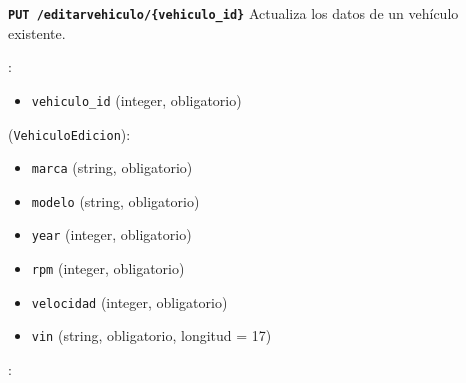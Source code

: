 \documentclass[a4paper,11pt,spanish]{sphinxmanual}
\newcommand{\robotoMonoBold}{\fontseries{b}\selectfont\ttfamily}
\renewcommand{\sphinxcode}[1]{\textcolor{sphinxorangeCode}{{\robotoMonoBold #1}}}
\renewcommand{\sphinxbfcode}[1]{\textbf{\sphinxcode{#1}}}
\renewcommand{\sphinxupquote}[1]{\texttt{#1}}
\begin{document}
\begin{fulllineitems}
\label{\detokenize{endpoints:put--editar-vehiculo-vehiculo_id}}
\pysigstartsignatures
\pysigline
{\sphinxbfcode{\sphinxupquote{PUT~}}\sphinxbfcode{\sphinxupquote{/editar\sphinxhyphen{}vehiculo/\{vehiculo\_id\}}}}
\pysigstopsignatures
\sphinxAtStartPar
Actualiza los datos de un vehículo existente.

\sphinxAtStartPar
{}:
\begin{itemize}
\item {} 
\sphinxAtStartPar
\sphinxcode{\sphinxupquote{vehiculo\_id}} (integer, obligatorio)

\end{itemize}

\sphinxAtStartPar
{} (\sphinxcode{\sphinxupquote{VehiculoEdicion}}):
\begin{itemize}
\item {} 
\sphinxAtStartPar
\sphinxcode{\sphinxupquote{marca}} (string, obligatorio)

\item {} 
\sphinxAtStartPar
\sphinxcode{\sphinxupquote{modelo}} (string, obligatorio)

\item {} 
\sphinxAtStartPar
\sphinxcode{\sphinxupquote{year}} (integer, obligatorio)

\item {} 
\sphinxAtStartPar
\sphinxcode{\sphinxupquote{rpm}} (integer, obligatorio)

\item {} 
\sphinxAtStartPar
\sphinxcode{\sphinxupquote{velocidad}} (integer, obligatorio)

\item {} 
\sphinxAtStartPar
\sphinxcode{\sphinxupquote{vin}} (string, obligatorio, longitud = 17)

\end{itemize}

\sphinxAtStartPar
{}:

\begin{sphinxVerbatim}[commandchars=\\\{\}]
  
 
 
 

\end{sphinxVerbatim}


\end{fulllineitems}
\end{document}
